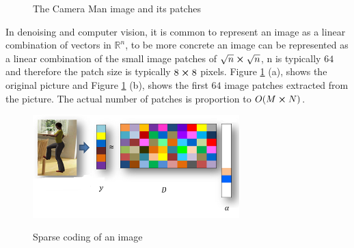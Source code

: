 \documentclass[12pt,letterpaper]{article}
\begin{document}
\begin{figure}[h]
    \centering
    \quad
    \caption{The Camera Man image and its patches}
    \label{fig:cameraman}
\end{figure}
  
In denoising and computer vision, it is common to represent an image as a linear combination of vectors in $\mathbb{R}^n$, to be more concrete an image can be represented as a linear combination of the small image patches of $\sqrt{n} \cross \sqrt{n}$, n is typically $64$ and therefore the patch size is typically $8 \cross 8$ pixels. Figure \ref{fig:cameraman} (a), shows the original picture and Figure \ref{fig:cameraman} (b), shows the first $64$ image patches extracted from the picture. The actual number of patches is proportion to $O(M \cross N)$.

\begin{figure}[h]
    \centering
    
    {\includegraphics[width=8cm]{sparse_dict_y.png} }
    
    \caption{Sparse coding of an image}
    \label{fig:sparcecode}
\end{figure}
\end{document}
